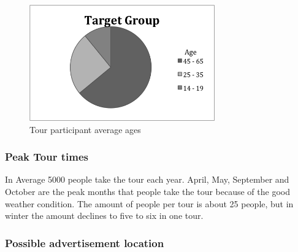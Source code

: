 \begin{figure}[H]
    \centering
    \includegraphics[width=8cm, height=5cm]{Figures/4/target_group}%
    \caption{Tour participant average ages}%
    \label{fig:target_group}%
\end{figure}


\subsubsection{Peak Tour times}
In Average 5000 people take the tour each year. April, May, September and October are the peak months that people take the tour because of the good weather condition. The amount of people per tour is about 25 people, but in winter the amount declines to five to six in one tour.

\subsubsection{Possible advertisement location}

